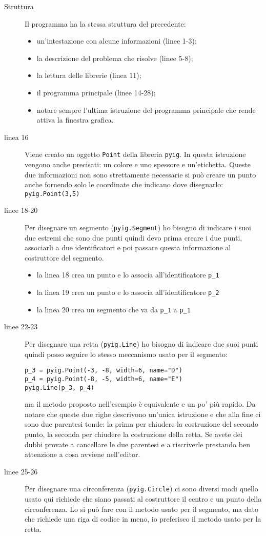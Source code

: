 \begin{description}
 \item [Struttura] 
 Il programma ha la stessa struttura del precedente:
\begin{itemize} [nosep]
 \item un'intestazione con alcune informazioni (linee 1-3); 
 \item la descrizione del problema che risolve (linee 5-8);
 \item la lettura delle librerie (linea 11);
 \item il programma principale (linee 14-28);
 \item notare sempre l'ultima istruzione del programma principale che rende 
attiva la finestra grafica.
\end{itemize}
 \item [linea 16]
 Viene creato un oggetto \lstinline{Point} della libreria \lstinline{pyig}. 
In questa istruzione vengono anche precisati: un colore e uno spessore e 
un'etichetta.
Queste due informazioni non sono strettamente necessarie si può creare un 
punto 
anche fornendo solo le coordinate che indicano dove disegnarlo:
\lstinline{pyig.Point(3,5)}
 \item [linee 18-20]
 Per disegnare un segmento (\lstinline{pyig.Segment}) ho bisogno di indicare 
i 
suoi due estremi che sono due punti quindi devo prima creare i due punti, 
associarli a due identificatori e poi passare questa informazione al 
costruttore 
del segmento. 
\begin{itemize} [nosep]
 \item la linea 18 crea un punto e lo associa all'identificatore 
 \lstinline{p_1}
 \item la linea 19 crea un punto e lo associa all'identificatore 
 \lstinline{p_2}
 \item la linea 20 crea un segmento che va da 
 \lstinline{p_1} a \lstinline{p_1}
\end{itemize}
 \item [linee 22-23]
 Per disegnare una retta (\lstinline{pyig.Line}) ho bisogno di indicare due 
suoi
punti quindi posso seguire lo stesso meccanismo usato per il segmento:
\begin{lstlisting}[numbers=none]
p_3 = pyig.Point(-3, -8, width=6, name="D")
p_4 = pyig.Point(-8, -5, width=6, name="E")
pyig.Line(p_3, p_4)
\end{lstlisting}
ma il metodo proposto nell'esempio è equivalente e un po' più rapido.
Da notare che queste due righe descrivono un'unica istruzione e che alla fine 
ci sono due parentesi tonde: la prima per chiudere la costruzione del secondo 
punto, la seconda per chiudere la costruzione della retta.
Se avete dei dubbi provate a cancellare le due parentesi e a riscriverle 
prestando ben attenzione a cosa avviene nell'editor.
\item [linee 25-26]
Per disegnare una circonferenza (\lstinline{pyig.Circle}) ci sono diversi 
modi quello usato qui richiede che siano passati al costruttore il centro 
e un punto della circonferenza. 
Lo si può fare con il metodo usato per il segmento, ma dato che richiede 
una riga di codice in meno, io preferisco il metodo usato per la retta.
\end{description}

